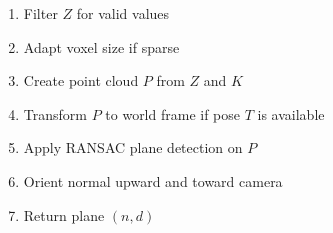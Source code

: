 \begin{enumerate}
    \item Filter $Z$ for valid values
    \item Adapt voxel size if sparse
    \item Create point cloud $P$ from $Z$ and $K$
    \item Transform $P$ to world frame if pose $T$ is available
    \item Apply RANSAC plane detection on $P$
    \item Orient normal upward and toward camera
    \item Return plane $(n,d)$
\end{enumerate}

